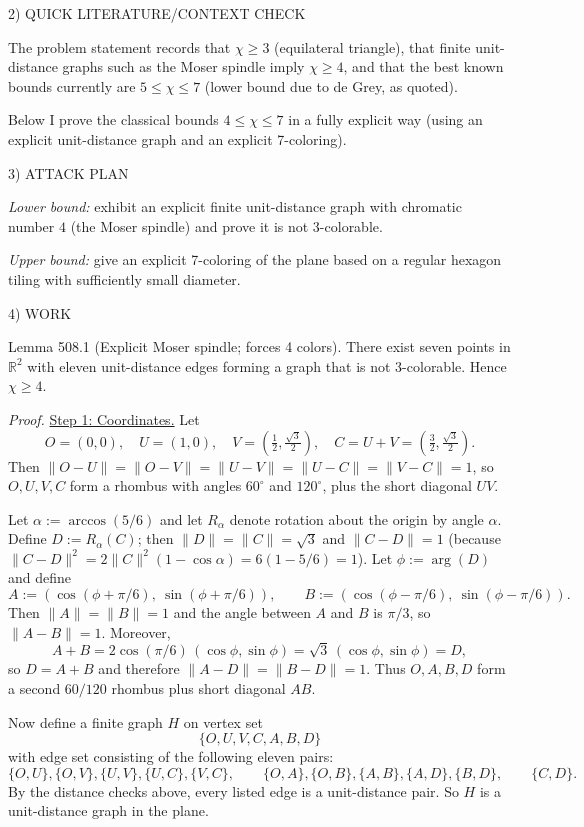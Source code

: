 2) QUICK LITERATURE/CONTEXT CHECK

The problem statement records that $\chi\ge 3$ (equilateral triangle), that finite unit-distance graphs such as the Moser spindle imply $\chi\ge 4$, and that the best known bounds currently are $5\le \chi\le 7$ (lower bound due to de Grey, as quoted).

Below I prove the classical bounds $4\le \chi\le 7$ in a fully explicit way (using an explicit unit-distance graph and an explicit 7-coloring).

3) ATTACK PLAN

\emph{Lower bound:} exhibit an explicit finite unit-distance graph with chromatic number $4$ (the Moser spindle) and prove it is not 3-colorable.

\emph{Upper bound:} give an explicit 7-coloring of the plane based on a regular hexagon tiling with sufficiently small diameter.

4) WORK

Lemma 508.1 (Explicit Moser spindle; forces 4 colors).
There exist seven points in $\mathbb R^2$ with eleven unit-distance edges forming a graph that is not 3-colorable. Hence $\chi\ge 4$.

\emph{Proof.}
\underline{Step 1: Coordinates.}
Let
\[
O=(0,0),\quad U=(1,0),\quad V=\left(\tfrac12,\tfrac{\sqrt3}{2}\right),\quad C=U+V=\left(\tfrac32,\tfrac{\sqrt3}{2}\right).
\]
Then $\lVert O-U\rVert=\lVert O-V\rVert=\lVert U-V\rVert=\lVert U-C\rVert=\lVert V-C\rVert=1$, so $O,U,V,C$ form a rhombus with angles $60^\circ$ and $120^\circ$, plus the short diagonal $UV$.

Let $\alpha:=\arccos(5/6)$ and let $R_{\alpha}$ denote rotation about the origin by angle $\alpha$.
Define $D:=R_{\alpha}(C)$; then $\lVert D\rVert=\lVert C\rVert=\sqrt3$ and $\lVert C-D\rVert=1$ (because
$\lVert C-D\rVert^2=2\lVert C\rVert^2(1-\cos\alpha)=6(1-5/6)=1$).
Let $\phi:=\arg(D)$ and define
\[
A:=(\cos(\phi+\pi/6),\ \sin(\phi+\pi/6)),\qquad B:=(\cos(\phi-\pi/6),\ \sin(\phi-\pi/6)).
\]
Then $\lVert A\rVert=\lVert B\rVert=1$ and the angle between $A$ and $B$ is $\pi/3$, so $\lVert A-B\rVert=1$.
Moreover,
\[
A+B = 2\cos(\pi/6)\,(\cos\phi,\sin\phi)=\sqrt3\,(\cos\phi,\sin\phi)=D,
\]
so $D=A+B$ and therefore $\lVert A-D\rVert=\lVert B-D\rVert=1$.
Thus $O,A,B,D$ form a second $60/120$ rhombus plus short diagonal $AB$.

Now define a finite graph $H$ on vertex set
\[\{O,U,V,C,A,B,D\}
\]
with edge set consisting of the following eleven pairs:
\[
\{O,U\},\{O,V\},\{U,V\},\{U,C\},\{V,C\},\qquad
\{O,A\},\{O,B\},\{A,B\},\{A,D\},\{B,D\},\qquad
\{C,D\}.
\]
By the distance checks above, every listed edge is a unit-distance pair.
So $H$ is a unit-distance graph in the plane.

